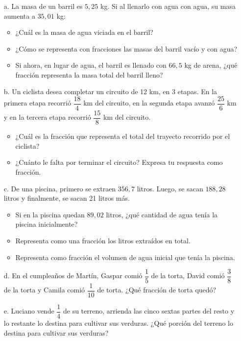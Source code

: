 \documentclass[spanish,letterpaper, 11pt, addpoints, answers]{exam}
\begin{document}
\begin{questions}
\begin{itemize}
  \item[a.] La masa de un barril es $5{,}25$ kg. Si al llenarlo con agua con agua, su masa aumenta a $35{,}01$ kg:
  \begin{itemize}
    \item ¿Cuál es la masa de agua viciada en el barril?
    \item ¿Cómo se representa con fracciones las masas del barril vacío y con agua?
    \item Si ahora, en lugar de agua, el barril es llenado con $66{,}5$ kg de arena, ¿qué fracción representa la masa total del barril lleno?
  \end{itemize}
  \item[b.] Un ciclista desea completar un circuito de 12 km, en 3 etapas. En la primera etapa recorrió $\dfrac{18}{4}$ km del circuito, en la segunda etapa avanzó $\dfrac{25}{6}$ km y en la tercera etapa recorrió $\dfrac{15}{8}$ km del circuito.
  \begin{itemize}
    \item ¿Cuál es la fracción que representa el total del trayecto recorrido por el ciclista?
    \item ¿Cuánto le falta por terminar el circuito? Expresa tu respuesta como fracción.
  \end{itemize}
  \item[c.] De una piscina, primero se extraen $356{,}7$ litros. Luego, se sacan $188{,}28$ litros y finalmente, se sacan 21 litros más.
  \begin{itemize}
    \item Si en la piscina quedan $89{,}02$ litros, ¿qué cantidad de agua tenía la piscina inicialmente?
    \item Representa como una fracción los litros extraídos en total.
    \item Representa como fracción el volumen de agua inicial que tenía la piscina.
  \end{itemize}
  \item[d.] En el cumpleaños de Martín, Gaspar comió $\dfrac{1}{5}$ de la torta, David comió $\dfrac{3}{8}$ de la torta y Camila comió $\dfrac{1}{10}$ de torta. ¿Qué fracción de torta quedó?
  \item[e.] Luciano vende $\dfrac{1}{4}$ de su terreno, arrienda las cinco sextas partes del resto y lo restante lo destina para cultivar sus verduras. ¿Qué porción del terreno lo destina para cultivar sus verduras?
\end{itemize}
\end{questions}
\end{document}
